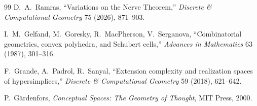 \documentclass[11pt]{article}
\begin{document}
\begin{thebibliography}{99}
D.~A.~Ramras,
``Variations on the Nerve Theorem,''
\emph{Discrete \& Computational Geometry} 75 (2026), 871--903.

I.~M.~Gelfand, M.~Goresky, R.~MacPherson, V.~Serganova,
``Combinatorial geometries, convex polyhedra, and Schubert cells,''
\emph{Advances in Mathematics} 63 (1987), 301--316.

F.~Grande, A.~Padrol, R.~Sanyal,
``Extension complexity and realization spaces of hyper\-simplices,''
\emph{Discrete \& Computational Geometry} 59 (2018), 621--642.

P.~G\"ardenfors,
\emph{Conceptual Spaces: The Geometry of Thought},
MIT Press, 2000.

\end{thebibliography}
\end{document}
